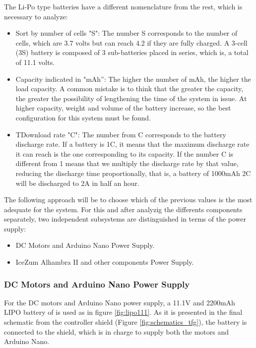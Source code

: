 The Li-Po type batteries have a different nomenclature from the rest, which is necessary to analyze:

\begin{itemize}
	\item Sort by number of cells "S": The number S corresponds to the number of cells, which are 3.7 volts but can reach 4.2 if they are fully charged. A 3-cell (3S) battery is composed of 3 sub-batteries placed in series, which is, a total of 11.1 volts.
	\item Capacity indicated in "mAh”: The higher the number of mAh, the higher the load capacity. A common mistake is to think that the greater the capacity, the greater the possibility of lengthening the time of the system in issue. At higher capacity, weight and volume of the battery increase, so the best configuration for this system must be found.
	\item TDownload rate "C": The number from C corresponds to the battery discharge rate. If a battery is 1C, it means that the maximum discharge rate it can reach is the one corresponding to its capacity. If the number C is different from 1 means that we multiply the discharge rate by that value, reducing the discharge time proportionally, that is, a battery of 1000mAh 2C will be discharged to 2A in half an hour.
\end{itemize}

The following approach will be to choose which of the previous values is the most adequate for the system. For this and after analyzig the differents components separately, two independent subsystems are distinguished in terms of the power supply:

\begin{itemize}
	\item DC Motors and Arduino Nano Power Supply.
	\item IceZum Alhambra II and other components Power Supply.
\end{itemize}

\subsubsection{DC Motors and Arduino Nano Power Supply}
For the DC motors and Arduino Nano power supply, a 11.1V and 2200mAh LIPO battery of is used as in figure \ref{fig:lipo111}. As it is presented in the final schematic from the controller
shield (Figure \ref{fig:schematics_tfg}), the battery is connected to the shield, which is in charge to supply both the motors and Arduino Nano.

